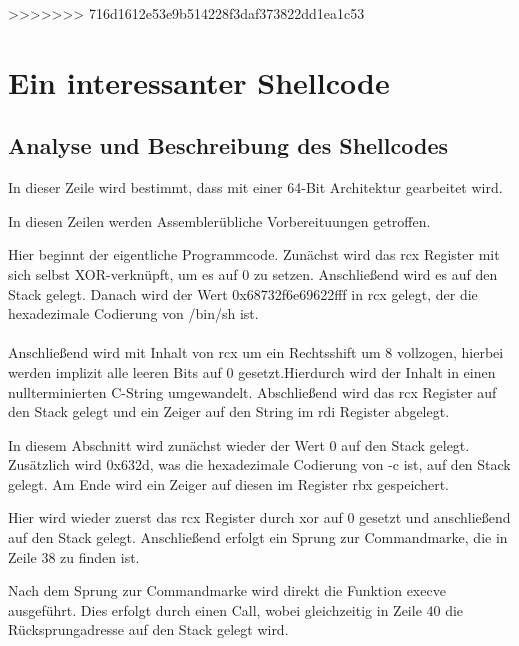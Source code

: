 \documentclass[12pt]{article}
\begin{document}
>>>>>>> 716d1612e53e9b514228f3daf373822dd1ea1c53

	\section{Ein interessanter Shellcode}
		\subsection{Analyse und Beschreibung des Shellcodes}
			
			In dieser Zeile wird bestimmt, dass mit einer 64-Bit Architektur gearbeitet wird.

					
			In diesen Zeilen werden Assembler\"ubliche Vorbereituungen getroffen.
			
			
			Hier beginnt der eigentliche Programmcode. Zun\"achst wird das rcx Register mit sich selbst XOR-verknüpft, um es auf 0 zu setzen. Anschlie{\ss}end wird es auf den Stack gelegt. Danach wird der Wert 0x68732f6e69622fff in rcx gelegt, der die hexadezimale Codierung von /bin/sh ist.\\
			~\\
			Anschlie{\ss}end wird mit Inhalt von rcx um ein Rechtsshift um 8 vollzogen, hierbei werden implizit alle leeren Bits auf 0 gesetzt.Hierdurch wird der Inhalt in einen nullterminierten C-String umgewandelt. Abschlie{\ss}end wird das rcx Register auf den Stack gelegt und ein Zeiger auf den String im rdi Register abgelegt.
			
			
			In diesem Abschnitt wird zun\"achst wieder der Wert 0 auf den Stack gelegt. Zus\"atzlich wird 0x632d, was die hexadezimale Codierung von -c ist, auf den Stack gelegt. Am Ende wird ein Zeiger auf diesen im Register rbx gespeichert.
			
			
			Hier wird wieder zuerst das rcx Register durch xor auf 0 gesetzt und anschlie{\ss}end auf den Stack gelegt. Anschlie{\ss}end erfolgt ein Sprung zur Commandmarke, die in Zeile 38 zu finden ist.
			
			
			Nach dem Sprung zur Commandmarke wird direkt die Funktion execve ausgef\"uhrt. Dies erfolgt durch einen Call, wobei gleichzeitig in Zeile 40 die R\"ucksprungadresse auf den Stack gelegt wird.
			
\end{document}
